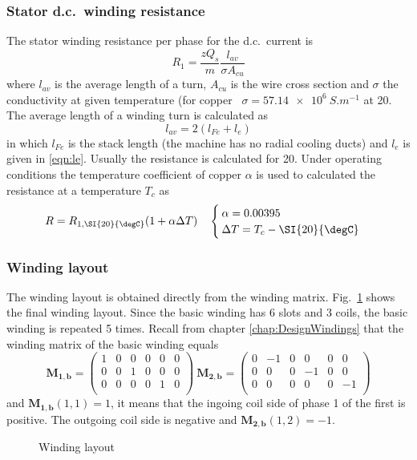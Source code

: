 \subsubsection{Stator d.c.~winding resistance}
The stator winding resistance per phase for the d.c.~current is 
\begin{equation}
  \label{eqn:R1a}
  R_1 =  \frac{zQ_s}{m} \frac{l_{av}}{\sigma A_{cu}}
\end{equation}
where $l_{av}$ is the average length of a turn, $A_{cu}$ is the wire cross section and $\sigma$ the conductivity at given temperature (for copper~%
$\sigma = \SI{57.14e6}{S.m^{-1}}$ at \SI{20}{\degC}. The average length of a winding turn is calculated as
\begin{equation}
  \label{eqn:lav}
  l_{av} = 2(l_{Fe}+l_e)
\end{equation} 
in which $l_{Fe}$ is the stack length (the machine has no radial cooling ducts) and $l_e$ is given in \eqref{eqn:le}. Usually the resistance is calculated for \SI{20}{\degC}. Under operating conditions the temperature coefficient of copper $\alpha$ is used to calculated the resistance at a temperature $T_c$ as
\begin{equation}
  R = R_{1,\SI{20}{\degC}}(1+\alpha \Delta T)
  \quad
  \begin{cases}
  \alpha = 0.00395\\
  \Delta T = T_c-\SI{20}{\degC}
  \end{cases}
\end{equation} 

\subsubsection{Winding layout}
The winding layout is obtained directly from the winding matrix. Fig.~\ref{fig:w_layout} shows the final winding layout. Since the basic winding has 6 slots and 3 coils, the basic winding is repeated 5 times. Recall from chapter \ref{chap:DesignWindings} that the winding matrix of the basic winding equals 
\begin{equation}
  \mathbf{M_{1,b}} = 
  \begin{pmatrix}
  1&0&0&0&0&0\\
  0&0&1&0&0&0\\
  0&0&0&0&1&0\\
  \end{pmatrix} \
  \mathbf{M_{2,b}} = 
  \begin{pmatrix}
  0&-1&0&0 &0&0 \\
  0&0 &0&-1&0&0 \\
  0&0 &0&0 &0&-1\\
  \end{pmatrix} 
\end{equation}
and $\mathbf{M_{1,b}}(1,1)=1$, it means that the ingoing coil side of phase 1 of the first is positive. The outgoing coil side is negative and $\mathbf{M_{2,b}}(1,2)=-1$. 
\begin{figure}[htbp]
  \centering
    
  \caption{Winding layout}
  \label{fig:w_layout}
\end{figure}

